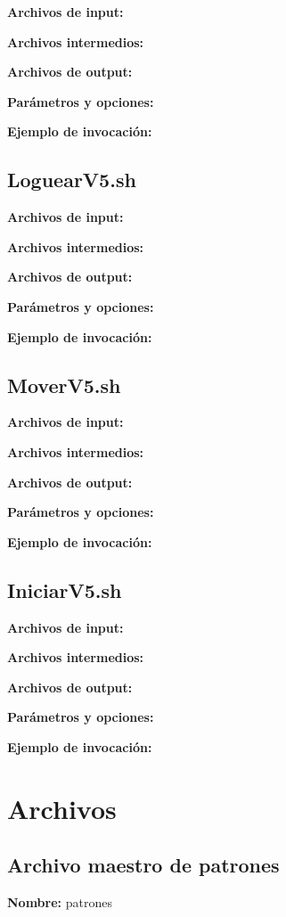 \documentclass[a4paper,12pt]{article}
\begin{document}
{\bf Archivos de input:} 

{\bf Archivos intermedios:} 

{\bf Archivos de output:} 

{\bf Parámetros y opciones:} 

{\bf Ejemplo de invocación:} 


\subsection{ LoguearV5.sh }

{\bf Archivos de input:} 

{\bf Archivos intermedios:} 

{\bf Archivos de output:} 

{\bf Parámetros y opciones:} 

{\bf Ejemplo de invocación:} 


\subsection { MoverV5.sh }

{\bf Archivos de input:} 

{\bf Archivos intermedios:} 

{\bf Archivos de output:} 

{\bf Parámetros y opciones:} 

{\bf Ejemplo de invocación:} 


\subsection{  IniciarV5.sh }

{\bf Archivos de input:} 

{\bf Archivos intermedios:} 

{\bf Archivos de output:} 

{\bf Parámetros y opciones:} 

{\bf Ejemplo de invocación:} 

\section{Archivos}

\subsection{Archivo maestro de patrones}

{\bf Nombre:} patrones
\end{document}
